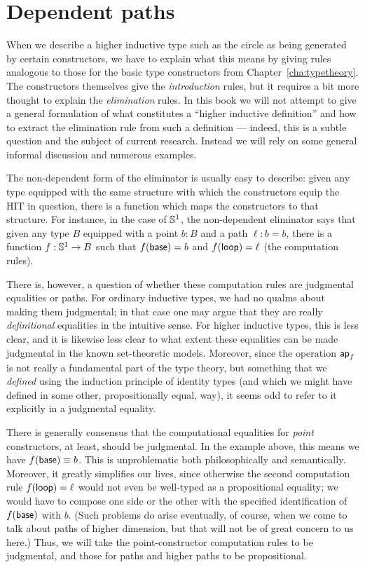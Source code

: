 \section{Dependent paths}
\label{sec:dependent-paths}

When we describe a higher inductive type such as the circle as being generated by certain constructors, we have to explain what this means by giving rules analogous to those for the basic type constructors from Chapter~\ref{cha:typetheory}.
The constructors themselves give the \emph{introduction} rules, but it requires a bit more thought to explain the \emph{elimination} rules.
In this book we will not attempt to give a general formulation of what constitutes a ``higher inductive definition'' and how to extract the elimination rule from such a definition --- indeed, this is a subtle question and the subject of current research.
Instead we will rely on some general informal discussion and numerous examples.

The non-dependent form of the eliminator is usually easy to describe: given any type equipped with the same structure with which the constructors equip the HIT in question, there is a function which maps the constructors to that structure.
For instance, in the case of $\mathbb{S}^1$, the non-dependent eliminator says that given any type $B$ equipped with a point $b:B$ and a path $\ell:b=b$, there is a function $f:\mathbb{S}^1\to B$ such that $f(\mathsf{base})=b$ and ${f}\!\left({\mathsf{loop}}\right) = \ell$ (the computation rules).

There is, however, a question of whether these computation rules are judgmental equalities or paths.
For ordinary inductive types, we had no qualms about making them judgmental; in that case one may argue that they are really \emph{definitional} equalities in the intuitive sense.
For higher inductive types, this is less clear, and it is likewise less clear to what extent these equalities can be made judgmental in the known set-theoretic models.
Moreover, since the operation $\mathsf{ap}_{f}$ is not really a fundamental part of the type theory, but something that we \emph{defined} using the induction principle of identity types (and which we might have defined in some other, propositionally equal, way), it seems odd to refer to it explicitly in a judgmental equality.

There is generally consensus that the computational equalities for \emph{point} constructors, at least, should be judgmental.
In the example above, this means we have $f(\mathsf{base})\equiv b$.
This is unproblematic both philosophically and semantically.
Moreover, it greatly simplifies our lives, since otherwise the second computation rule ${f}\!\left({\mathsf{loop}}\right) = \ell$ would not even be well-typed as a propositional equality; we would have to compose one side or the other with the specified identification of $f(\mathsf{base})$ with $b$.
(Such problems do arise eventually, of course, when we come to talk about paths of higher dimension, but that will not be of great concern to us here.)
Thus, we will take the point-constructor computation rules to be judgmental, and those for paths and higher paths to be propositional.

